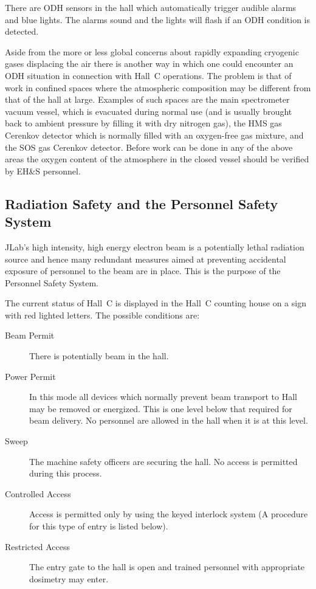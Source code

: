 There are ODH sensors in the hall which automatically trigger audible
alarms and blue lights. The alarms sound and the lights will flash if
an ODH condition is detected.

Aside from the more or less global concerns about rapidly expanding
cryogenic gases displacing the air there is another
way in which one could encounter an ODH situation in connection with Hall~C
operations. The problem is that of work in confined spaces where
the atmospheric composition may be different from that of the hall at
large. Examples of such spaces are the main spectrometer vacuum vessel,
which is evacuated during normal use (and is usually brought back to ambient
pressure by filling it with dry nitrogen gas), the HMS gas Cerenkov detector
which is normally filled with an oxygen-free gas mixture, and the
SOS gas Cerenkov detector. Before work can be done in any of the
above areas the oxygen content of the atmosphere in the closed vessel should
be verified by EH\&S personnel.

\subsection{Radiation Safety and the Personnel Safety System }

JLab's high intensity, high energy electron beam is a potentially lethal
radiation source and hence many redundant measures
aimed at preventing accidental exposure of personnel to the beam are in place.
This is the purpose of the Personnel Safety System.

The current status of Hall~C is displayed in the Hall~C counting house
on a sign with red lighted letters. The possible conditions are:
\begin{description}
\item[Beam Permit] There is potentially beam in the hall.
\item[Power Permit] In this mode all devices which normally prevent beam 
transport to Hall may be removed or energized.  This is one level below 
that required for beam delivery.
No personnel are allowed in the hall when it is at this level.
\item[Sweep] The machine safety officers are securing the hall.
No access is permitted during this process.
\item[Controlled Access] Access is permitted only by using the keyed
interlock system (A procedure for this type of entry is listed below).
\item[Restricted Access] The entry gate to the hall is open and trained
personnel with appropriate dosimetry may enter.
\end{description}

